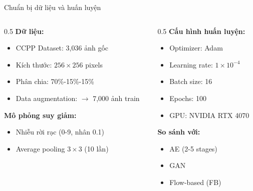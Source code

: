 \begin{frame}{Chuẩn bị dữ liệu và huấn luyện}
    \begin{columns}
        \begin{column}{0.5\textwidth}
            \textbf{Dữ liệu:}
            \begin{itemize}
                \item CCPP Dataset: 3,036 ảnh gốc
                \item Kích thước: $256 \times 256$ pixels
                \item Phân chia: 70\%-15\%-15\%
                \item Data augmentation: $\rightarrow$ 7,000 ảnh train
            \end{itemize}
            
            \vspace{0.3cm}
            \textbf{Mô phỏng suy giảm:}
            \begin{itemize}
                \item Nhiễu rời rạc (0-9, nhân 0.1)
                \item Average pooling $3 \times 3$ (10 lần)
            \end{itemize}
        \end{column}
        \begin{column}{0.5\textwidth}
            \textbf{Cấu hình huấn luyện:}
            \begin{itemize}
                \item Optimizer: Adam
                \item Learning rate: $1 \times 10^{-4}$
                \item Batch size: 16
                \item Epochs: 100
                \item GPU: NVIDIA RTX 4070
            \end{itemize}
            
            \vspace{0.3cm}
            \textbf{So sánh với:}
            \begin{itemize}
                \item AE (2-5 stages)
                \item GAN
                \item Flow-based (FB)
            \end{itemize}
        \end{column}
    \end{columns}
\end{frame}

